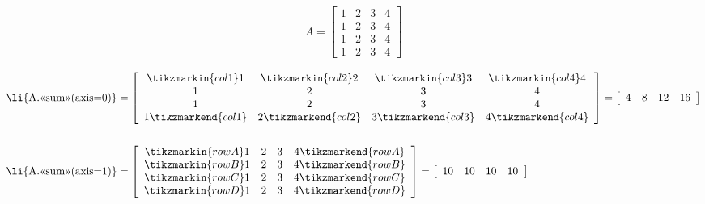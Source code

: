\begin{align*}
A = \left[\begin{array}{cccc}
1 & 2 & 3 & 4\\
1 & 2 & 3 & 4\\
1 & 2 & 3 & 4\\
1 & 2 & 3 & 4
\end{array}\right]
\end{align*}

\begin{align*}
\text{\li{A.<<sum>>(axis=0)}} &= %
\left[\begin{array}{cccc}
\tikzmarkin{col1}1 & \tikzmarkin{col2}2 & \tikzmarkin{col3}3 & \tikzmarkin{col4}4\\
1 & 2 & 3 & 4\\
1 & 2 & 3 & 4\\
1\tikzmarkend{col1} & 2\tikzmarkend{col2} & 3\tikzmarkend{col3} & 4\tikzmarkend{col4}
\end{array}\right]
= \left[\begin{array}{cccc} 4 & 8 & 12 & 16 \end{array}\right]
\\ \\
\text{\li{A.<<sum>>(axis=1)}} &= %
\left[\begin{array}{cccc}
\tikzmarkin{rowA}1 & 2 & 3 & 4\tikzmarkend{rowA}\\
\tikzmarkin{rowB}1 & 2 & 3 & 4\tikzmarkend{rowB}\\
\tikzmarkin{rowC}1 & 2 & 3 & 4\tikzmarkend{rowC}\\
\tikzmarkin{rowD}1 & 2 & 3 & 4\tikzmarkend{rowD}\\
\end{array}\right]
= \left[\begin{array}{cccc} 10 & 10 & 10 & 10 \end{array}\right]
\end{align*}

